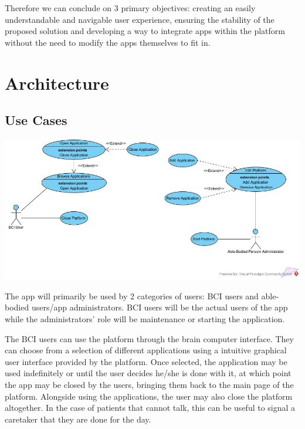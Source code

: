 \vspace*{2mm}
\hspace{\parindent} Therefore we can conclude on 3 primary objectives: creating an easily understandable and navigable user experience, ensuring the stability of the proposed solution and developing a way to integrate apps within the platform without the need to modify the apps themselves to fit in.



\section{Architecture}\label{sect:Architecture}

\subsection{Use Cases}\label{subsect:use cases}
\vspace{20pt}
\includegraphics[width = 420pt]{Diagrams/Use Case.jpg}

\hspace{\parindent} The app will primarily be used by 2 categories of users: BCI users and able-bodied users/app administrators. BCI users will be the actual users of the app while the administrators' role will be maintenance or starting the application. 

\hspace{\parindent} The BCI users can use the platform through the brain computer interface. They can choose from a selection of different applications using a intuitive graphical user interface provided by the platform. Once selected, the application may be used indefinitely or until the user decides he/she is done with it, at which point the app may be closed by the users, bringing them back to the main page of the platform. Alongside using the applications, the user may also close the platform altogether. In the case of patients that cannot talk, this can be useful to signal a caretaker that they are done for the day.

